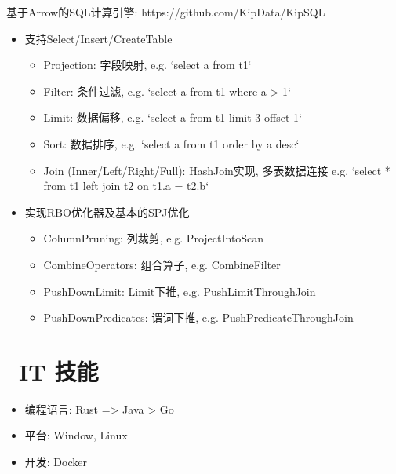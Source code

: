 \documentclass{resume}
\begin{document}
\begin{onehalfspacing}
  基于Arrow的SQL计算引擎: https://github.com/KipData/KipSQL
  \begin{itemize}
    \item 支持Select/Insert/CreateTable
      \begin{itemize}
        \item Projection: 字段映射, e.g. `select a from t1`
        \item Filter: 条件过滤, e.g. `select a from t1 where a > 1`
        \item Limit: 数据偏移, e.g. `select a from t1 limit 3 offset 1`
        \item Sort: 数据排序, e.g. `select a from t1 order by a desc`
        \item Join (Inner/Left/Right/Full): HashJoin实现, 多表数据连接 e.g. `select * from t1 left join t2 on t1.a = t2.b`
      \end{itemize}
    \item 实现RBO优化器及基本的SPJ优化
      \begin{itemize}
        \item ColumnPruning: 列裁剪, e.g. ProjectIntoScan
        \item CombineOperators: 组合算子, e.g. CombineFilter
        \item PushDownLimit: Limit下推, e.g. PushLimitThroughJoin
        \item PushDownPredicates: 谓词下推, e.g. PushPredicateThroughJoin
      \end{itemize}
  \end{itemize}
\end{onehalfspacing}


\section{\faCogs\ IT 技能}
\begin{itemize}[parsep=0.5ex]
  \item 编程语言: Rust => Java > Go
  \item 平台: Window, Linux
  \item 开发: Docker
\end{itemize}
\end{document}
